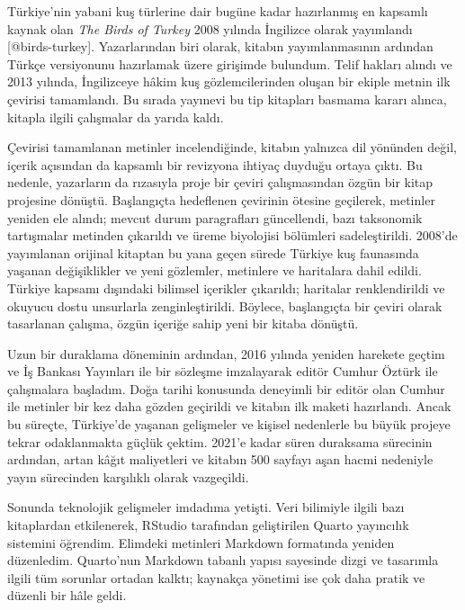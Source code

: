 \documentclass[
  a4paper,
  DIV=11,
  numbers=noendperiod]{scrartcl}
\begin{document}

Türkiye'nin yabani kuş türlerine dair bugüne kadar hazırlanmış en
kapsamlı kaynak olan \emph{The Birds of Turkey} 2008 yılında İngilizce
olarak yayımlandı {[}@birds-turkey{]}. Yazarlarından biri olarak,
kitabın yayımlanmasının ardından Türkçe versiyonunu hazırlamak üzere
girişimde bulundum. Telif hakları alındı ve 2013 yılında, İngilizceye
hâkim kuş gözlemcilerinden oluşan bir ekiple metnin ilk çevirisi
tamamlandı. Bu sırada yayınevi bu tip kitapları basmama kararı alınca,
kitapla ilgili çalışmalar da yarıda kaldı.

Çevirisi tamamlanan metinler incelendiğinde, kitabın yalnızca dil
yönünden değil, içerik açısından da kapsamlı bir revizyona ihtiyaç
duyduğu ortaya çıktı. Bu nedenle, yazarların da rızasıyla proje bir
çeviri çalışmasından özgün bir kitap projesine dönüştü. Başlangıçta
hedeflenen çevirinin ötesine geçilerek, metinler yeniden ele alındı;
mevcut durum paragrafları güncellendi, bazı taksonomik tartışmalar
metinden çıkarıldı ve üreme biyolojisi bölümleri sadeleştirildi. 2008'de
yayımlanan orijinal kitaptan bu yana geçen sürede Türkiye kuş faunasında
yaşanan değişiklikler ve yeni gözlemler, metinlere ve haritalara dahil
edildi. Türkiye kapsamı dışındaki bilimsel içerikler çıkarıldı;
haritalar renklendirildi ve okuyucu dostu unsurlarla zenginleştirildi.
Böylece, başlangıçta bir çeviri olarak tasarlanan çalışma, özgün içeriğe
sahip yeni bir kitaba dönüştü.

Uzun bir duraklama döneminin ardından, 2016 yılında yeniden harekete
geçtim ve İş Bankası Yayınları ile bir sözleşme imzalayarak editör
Cumhur Öztürk ile çalışmalara başladım. Doğa tarihi konusunda deneyimli
bir editör olan Cumhur ile metinler bir kez daha gözden geçirildi ve
kitabın ilk maketi hazırlandı. Ancak bu süreçte, Türkiye'de yaşanan
gelişmeler ve kişisel nedenlerle bu büyük projeye tekrar odaklanmakta
güçlük çektim. 2021'e kadar süren duraksama sürecinin ardından, artan
kâğıt maliyetleri ve kitabın 500 sayfayı aşan hacmi nedeniyle yayın
sürecinden karşılıklı olarak vazgeçildi.

Sonunda teknolojik gelişmeler imdadıma yetişti. Veri bilimiyle ilgili
bazı kitaplardan etkilenerek, RStudio tarafından geliştirilen Quarto
yayıncılık sistemini öğrendim. Elimdeki metinleri Markdown formatında
yeniden düzenledim. Quarto'nun Markdown tabanlı yapısı sayesinde dizgi
ve tasarımla ilgili tüm sorunlar ortadan kalktı; kaynakça yönetimi ise
çok daha pratik ve düzenli bir hâle geldi.
\end{document}

